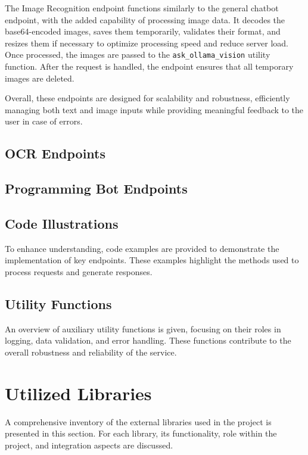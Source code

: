The Image Recognition endpoint functions similarly to the general chatbot endpoint, with the added capability of processing image data. It decodes the base64-encoded images, saves them temporarily, validates their format, and resizes them if necessary to optimize processing speed and reduce server load. Once processed, the images are passed to the \texttt{ask\_ollama\_vision} utility function. After the request is handled, the endpoint ensures that all temporary images are deleted.

Overall, these endpoints are designed for scalability and robustness, efficiently managing both text and image inputs while providing meaningful feedback to the user in case of errors.


\subsection{OCR Endpoints}



\subsection{Programming Bot Endpoints}

\subsection{Code Illustrations}
To enhance understanding, code examples are provided to demonstrate the implementation of key endpoints. These examples highlight the methods used to process requests and generate responses.


\subsection{Utility Functions}
An overview of auxiliary utility functions is given, focusing on their roles in logging, data validation, and error handling. These functions contribute to the overall robustness and reliability of the service.


\section{Utilized Libraries}
A comprehensive inventory of the external libraries used in the project is presented in this section. For each library, its functionality, role within the project, and integration aspects are discussed.


